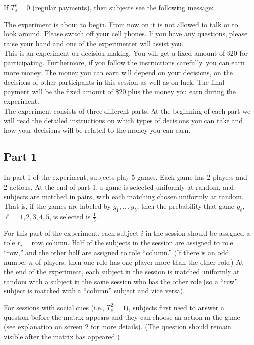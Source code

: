 \documentclass[11pt]{article}
\begin{document}
If $T_s^1=0$ (regular payments), then subjects see the following message:

\begin{tcolorbox}
The experiment is about to begin. From now on it is not allowed to talk or to look around. Please switch off your cell phones. If you have any questions, please raise your hand and one of the experimenter will assist you.\\

This is an experiment on decision making. You will get a fixed amount of \$20 for participating. Furthermore, if you follow the instructions carefully, you can earn more money. The money you can earn will depend on your decisions, on the decisions of other participants in this session as well as on luck. The final payment will be the fixed amount of \$20 plus the money you earn during the experiment.\\

The experiment consists of three different parts.  At the beginning of each part we will read the detailed instructions on which types of decisions you can take and how your decisions will be related to the money you can earn.
\end{tcolorbox}


\subsection{Part 1}

In part 1 of the experiment, subjects play 5 games. Each game has 2 players and 2 actions. At the end of part 1, a game is selected uniformly at random, and subjects are matched in pairs, with each matching chosen uniformly at random. That is, if the games are labeled by $g_1,\dots,g_5$, then the probability that game $g_\ell$, $\ell=1,2,3,4,5$, is selected is $\tfrac{1}{5}$. 

For this part of the experiment, each subject $i$ in the session should be assigned a role $r_i=\text{row},\text{column}$. Half of the subjects in the session are assigned to role ``row,'' and the other half are assigned to role ``column.'' (If there is an odd number $n$ of players, then one role has one player more than the other role.) At the end of the experiment, each subject in the session is matched uniformly at random with a subject in the same session who has the other role (so a ``row'' subject is matched with a ``column'' subject and vice versa).

For sessions with social cues (i.e., $T_s^2=1$), subjects first need to answer a question before the matrix appears and they can choose an action in the game (see explanation on screen 2 for more details). (The question should remain visible after the matrix has appeared.)
\end{document}
